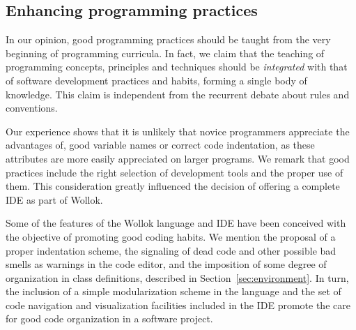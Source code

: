 \subsection{Enhancing programming practices}
In our opinion, good programming practices should be taught from the very beginning of programming curricula.
In fact, we claim that the teaching of programming concepts, principles and techniques should be \emph{integrated} with that of software development practices and habits, forming a single body of knowledge.
This claim is independent from the recurrent debate about rules and conventions. 

Our experience shows that it is unlikely that novice programmers appreciate the advantages of, \eg good variable names or correct code indentation, as these attributes are more easily appreciated on larger programs.
We remark that good practices include the right selection of development tools and the proper use of them. This consideration greatly influenced the decision of offering a complete IDE as part of Wollok.

Some of the features of the Wollok language and IDE have been conceived with the objective of promoting good coding habits. We mention the proposal of a proper indentation scheme, the signaling of dead code and other possible bad smells as warnings in the code editor, and the imposition of some degree of organization in class definitions, described in Section~\ref{sec:environment}.
In turn, the inclusion of a simple modularization scheme in the language and the set of code navigation and visualization facilities included in the IDE promote the care for good code organization in a software project.


